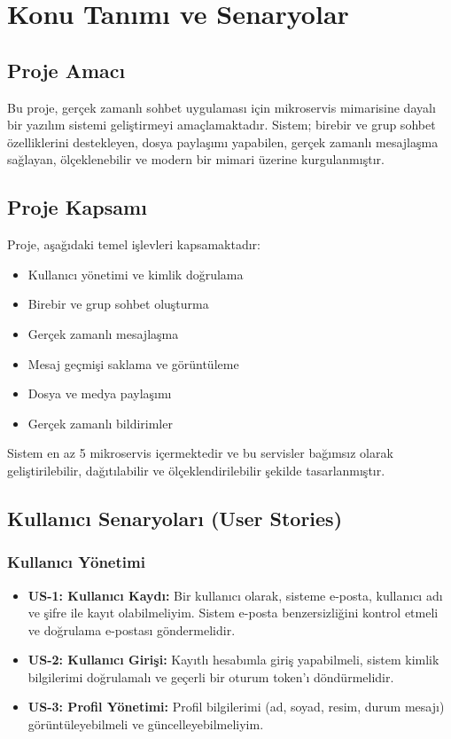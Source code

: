 \chapter{Konu Tanımı ve Senaryolar}

\section{Proje Amacı}
Bu proje, gerçek zamanlı sohbet uygulaması için mikroservis mimarisine dayalı bir yazılım sistemi geliştirmeyi amaçlamaktadır. Sistem; birebir ve grup sohbet özelliklerini destekleyen, dosya paylaşımı yapabilen, gerçek zamanlı mesajlaşma sağlayan, ölçeklenebilir ve modern bir mimari üzerine kurgulanmıştır.

\section{Proje Kapsamı}
Proje, aşağıdaki temel işlevleri kapsamaktadır:
\begin{itemize}
    \item Kullanıcı yönetimi ve kimlik doğrulama
    \item Birebir ve grup sohbet oluşturma
    \item Gerçek zamanlı mesajlaşma
    \item Mesaj geçmişi saklama ve görüntüleme
    \item Dosya ve medya paylaşımı
    \item Gerçek zamanlı bildirimler
\end{itemize}

Sistem en az 5 mikroservis içermektedir ve bu servisler bağımsız olarak geliştirilebilir, dağıtılabilir ve ölçeklendirilebilir şekilde tasarlanmıştır.

\section{Kullanıcı Senaryoları (User Stories)}

\subsection{Kullanıcı Yönetimi}
\begin{itemize}
    \item \textbf{US-1: Kullanıcı Kaydı:} Bir kullanıcı olarak, sisteme e-posta, kullanıcı adı ve şifre ile kayıt olabilmeliyim. Sistem e-posta benzersizliğini kontrol etmeli ve doğrulama e-postası göndermelidir.
    \item \textbf{US-2: Kullanıcı Girişi:} Kayıtlı hesabımla giriş yapabilmeli, sistem kimlik bilgilerimi doğrulamalı ve geçerli bir oturum token'ı döndürmelidir.
    \item \textbf{US-3: Profil Yönetimi:} Profil bilgilerimi (ad, soyad, resim, durum mesajı) görüntüleyebilmeli ve güncelleyebilmeliyim.
\end{itemize}

